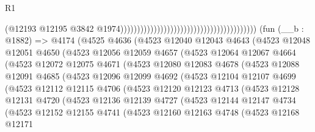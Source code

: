 \begin{lexlean}{R1}
\begin{coremodule}
                                                                                    (@12193
                                                                                      @12195
                                                                                      @3842
                                                                                      @1974)))))))))))))))))))))))))))))))))))))))))
    (fun (__b : @1882) =>
    @4174
      (@4525
        @4636
        (@4523
          @12040
          @12043
          @4643
          (@4523
            @12048
            @12051
            @4650
            (@4523
              @12056
              @12059
              @4657
              (@4523
                @12064
                @12067
                @4664
                (@4523
                  @12072
                  @12075
                  @4671
                  (@4523
                    @12080
                    @12083
                    @4678
                    (@4523
                      @12088
                      @12091
                      @4685
                      (@4523
                        @12096
                        @12099
                        @4692
                        (@4523
                          @12104
                          @12107
                          @4699
                          (@4523
                            @12112
                            @12115
                            @4706
                            (@4523
                              @12120
                              @12123
                              @4713
                              (@4523
                                @12128
                                @12131
                                @4720
                                (@4523
                                  @12136
                                  @12139
                                  @4727
                                  (@4523
                                    @12144
                                    @12147
                                    @4734
                                    (@4523
                                      @12152
                                      @12155
                                      @4741
                                      (@4523
                                        @12160
                                        @12163
                                        @4748
                                        (@4523
                                          @12168
                                          @12171

\end{coremodule}
\end{lexlean}
